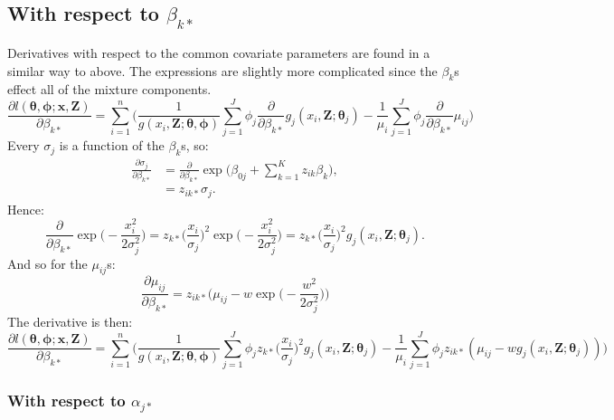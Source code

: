 \documentclass{report}
\begin{document}
\subsection*{With respect to $\beta_{k*}$}

Derivatives with respect to the common covariate parameters are found in a similar way to above. The expressions are slightly more complicated since the $\beta_k$s effect all of the mixture components.
\begin{equation*}
\frac{\partial l(\bm{\theta},\bm{\phi}; \mathbf{x},\mathbf{Z})}{\partial \beta_{k*}} = \sum_{i=1}^n \Big( \frac{1}{g(x_i,\mathbf{Z}; \bm{\theta},\bm{\phi})} \sum_{j=1}^J \phi_j \frac{\partial}{\partial \beta_{k*}} g_j(x_i,\mathbf{Z}; \bm{\theta}_j) - \frac{1}{\mu_i} \sum_{j=1}^J \phi_j \frac{\partial}{\partial \beta_{k*}}\mu_{ij}\Big)
\end{equation*}
Every $\sigma_{j}$ is a function of the $\beta_{k}$s, so:
\begin{align*}
\frac{\partial \sigma_{j}}{\partial \beta_{k*}} &= \frac{\partial}{\partial \beta_{k*}} \exp \Big( \beta_{0j} + \sum_{k=1}^K z_{ik} \beta_{k}\Big),\\
&= z_{ik*}\sigma_{j}.
\end{align*}
Hence:
\begin{equation*}
 \frac{\partial}{\partial \beta_{k*}} \exp\Big( -\frac{x_i^2}{2\sigma_{j}^2} \Big) = z_{k*} \Big( \frac{x_i}{\sigma_{j}}\Big)^2 \exp \Big(-\frac{x_i^2}{2 \sigma_{j}^2}\Big) = z_{k*} \Big( \frac{x_i}{\sigma_{j}}\Big)^2 g_j(x_i,\mathbf{Z}; \bm{\theta}_j).
 \label{detfct-deriv-k}
\end{equation*}
And so for the $\mu_{ij}$s:
\begin{equation*}
\frac{\partial \mu_{ij}}{\partial \beta_{k*}} = z_{ik*} \Big( \mu_{ij} - w \exp\Big( -\frac{w^2}{2\sigma_{j}^2} \Big) \Big)
\end{equation*}
The derivative is then:
\begin{equation*}
\frac{\partial l(\bm{\theta},\bm{\phi}; \mathbf{x},\mathbf{Z})}{\partial \beta_{k*}} = \sum_{i=1}^n \Big( \frac{1}{g(x_i,\mathbf{Z}; \bm{\theta},\bm{\phi})} \sum_{j=1}^J \phi_j  z_{k*} \Big( \frac{x_i}{\sigma_{j}}\Big)^2 g_j(x_i,\mathbf{Z}; \bm{\theta}_j) - \frac{1}{\mu_i} \sum_{j=1}^J \phi_j z_{ik*} ( \mu_{ij} - w g_j(x_i,\mathbf{Z}; \bm{\theta}_j) )\Big)
\end{equation*}

\subsubsection*{With respect to $\alpha_{j*}$}
\end{document}
